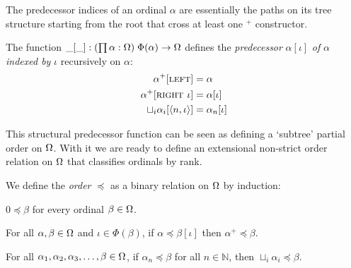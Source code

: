 The predecessor indices of an ordinal $\alpha$ are essentially the
paths on its tree structure starting from the root that cross at least
one $^+$ constructor.

\begin{definition}%
The function $\_[\_] : (\prod \alpha : \Omega) \; \Phi(\alpha)
\rightarrow \Omega$ defines the \emph{predecessor} $\alpha[\iota]$
\emph{of} $\alpha$ \emph{indexed by} $\iota$ recursively on $\alpha$:
\begin{align*}
  \alpha^+[\textsc{left}]                     &= \alpha \\
  \alpha^+[\textsc{right $\iota$}]            &= \alpha[\iota] \\
  \sqcup_i \alpha_i[\langle n, \iota \rangle] &= \alpha_n[\iota]
\end{align*}
\end{definition}


This structural predecessor function can be seen as defining a `subtree'
partial order on $\Omega$. With it we are ready to define an extensional
non-strict order relation on $\Omega$ that classifies ordinals by rank.

\begin{definition}\label{def:order}%
We define the \emph{order} $\preceq$ as a binary relation on $\Omega$ by
induction:
\begin{compactenum}
  \item
    $0 \preceq \beta$ for every ordinal $\beta \in \Omega$.
  \item\label{def:order:succ}
    For all $\alpha, \beta \in \Omega$ and $\iota \in \Phi(\beta)$, if
    $\alpha \preceq \beta[\iota]$ then $\alpha^+ \preceq \beta$.
  \item
    For all $\alpha_1, \alpha_2, \alpha_3, \ldots, \beta \in \Omega$, if
    $\alpha_n \preceq \beta$ for all $n \in \mathbb{N}$, then $\sqcup_i
    \alpha_i \preceq \beta$.
\end{compactenum}
\end{definition}

